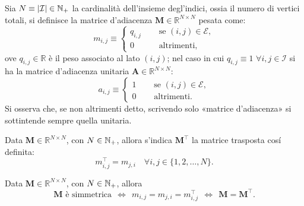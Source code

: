         \begin{dfn}
            \label{defMatriceAdiacenzaUnitariaPesata}
            \newcommand\hspz{\hspace{1em}}
            Sia \(N\equiv\vert\mathcal I\vert\in\mathbb N_+\) la cardinalità dell'insieme degl'indici, ossia il numero di vertici totali, si definisce la matrice d'adiacenza \(\mathbf M\in\mathbb R^{N\times N}\) pesata come:
            \begin{equation}
                \label{eqMatriceAdiacenzaPesata}
                m_{i,j}\equiv
                \left\{\begin{aligned}
                    q_{i,j}&\hspz\text{ se }(i,j)\in\mathcal E,\\
                    0&\hspz\text{ altrimenti},
                \end{aligned}\right.
            \end{equation}
            ove \(q_{i,j}\in\mathbb R\) è il peso associato al lato \((i,j)\); nel caso in cui \(q_{i,j}\equiv1\) \(\forall i,j\in\mathcal I\) si ha la matrice d'adiacenza unitaria \(\mathbf A\in\mathbb R^{N\times N}\):
            \begin{equation}
                \label{eqMatriceAdiacenzaUnitaria}
                a_{i,j}\equiv
                \left\{\begin{aligned}
                    1&\hspz\text{ se }(i,j)\in\mathcal E,\\
                    0&\hspz\text{ altrimenti}.
                \end{aligned}\right.
            \end{equation}
            Si osserva che, se non altrimenti detto, scrivendo solo «matrice d'adiacenza» si sottintende sempre quella unitaria.
        \end{dfn}

        \begin{dfn}
            Data \(\mathbf M\in\mathbb R^{N\times N}\), con \(N\in\mathbb N_+\), allora s'indica \(\mathbf M^\top\) la matrice trasposta cosí definita:
            \begin{equation*}
                m^\top_{i,j}=m_{j,i}\quad\forall i,j\in\{1,2,\ldots,N\}.
            \end{equation*}
        \end{dfn}

        \begin{dfn}
            Data \(\mathbf M\in\mathbb R^{N\times N}\), con \(N\in\mathbb N_+\), allora
            \begin{equation}
                \label{eqMatriceAdiacenzaSimmetrica}
                \mathbf M\text{ è simmetrica}
                \ \ \iff\ \ 
                m_{i,j}=m_{j,i}=m^\top_{i,j}
                \ \ \iff\ \ 
                \mathbf M=\mathbf M^\top.
            \end{equation}
        \end{dfn}

